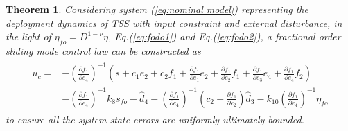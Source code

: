 \documentclass[ShortAfour]{sage}
\theoremstyle{plain}
\newtheorem{mythm}{Theorem}
\theoremstyle{remark}
\begin{document}
\begin{mythm}
  Considering system (\ref{eq:nominal model}) representing the deployment dynamics of TSS with input constraint and external disturbance, in the light of $\eta_{fo}=D^{1-\nu}\eta$, Eq.(\ref{eq:fodo1}) and Eq.(\ref{eq:fodo2}), a fractional order sliding mode control law can be constructed as
  \begin{align}\begin{split}
    u_c =& -\left(\frac{\partial f_1}{\partial e_4}\right)^{-1}\left(s+c_1e_2+c_2f_1+\frac{\partial f_1}{\partial e_1}e_2+\frac{\partial f_1}{\partial e_2}f_1+\frac{\partial f_1}{\partial e_3}e_4+\frac{\partial f_1}{\partial e_4}f_2\right)\\
    &-\left(\frac{\partial f_1}{\partial e_4}\right)^{-1}k_8s_{fo}-\hat d_4-\left(\frac{\partial f_1}{\partial e_4}\right)^{-1}\left(c_2+\frac{\partial f_1}{\partial e_2}\right)\hat d_3-k_{10}\left(\frac{\partial f_1}{\partial e_4}\right)^{-1}\eta_{fo}\label{eq:fouc}
  \end{split}\end{align}
  to ensure all the system state errors are uniformly ultimately bounded.
\end{mythm}
\end{document}
